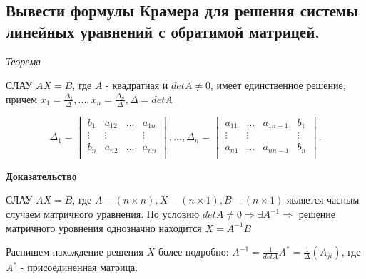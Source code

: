 \ep

\subsection{Вывести формулы Крамера для решения системы линейных уравнений с обратимой матрицей.}

\textit {Теорема}

\vspace*{15pt}

СЛАУ $AX = B$, где $A$ - квадратная и $detA \ne 0$, имеет единственное решение, причем $x_1 = \frac{\Delta_1}{\Delta}, ..., x_n = \frac{\Delta_n}{\Delta}, \Delta = detA$

$$
\Delta_1 = 
\begin{vmatrix}
    b_1&a_{12}&\ldots&a_{1n}\\
    \vdots&\vdots&&\vdots\\
    b_n&a_{n2}&\ldots&a_{nn}\\
\end{vmatrix}, ..., 
\Delta_n = 
\begin{vmatrix}
    a_{11}&\ldots&a_{1n-1}&b_1\\
    \vdots&\vdots&&\vdots\\
    a_{n1}&\ldots&a_{nn-1}&b_n\\
\end{vmatrix}.
$$

\vspace*{15pt}


{\bf{Доказательство}}

СЛАУ $AX = B$, где $A - (n\times n), X - (n \times 1), B - (n \times 1)$ является часным случаем матричного уравнения. По условию $detA \ne 0 \Rightarrow \exists A^{-1} \Rightarrow$ решение матричного уровнения однозначно находится $X = A^{-1}B$

Распишем нахождение решения $X$ более подробно:
$A^{-1} = \frac{1}{detA}A^* = \frac{1}{\Delta}(A_{ji})$, где $A^*$ - присоединенная матрица.

